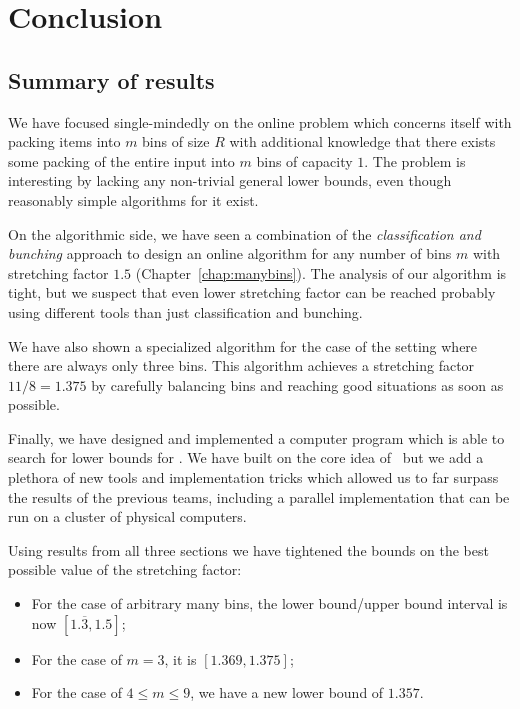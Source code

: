 \chapter{Conclusion}\label{chap:conclusion}

\section{Summary of results}

We have focused single-mindedly on the online problem \binstretch
which concerns itself with packing items into $m$ bins of size $R$
with additional knowledge that there exists some packing of the entire
input into $m$ bins of capacity $1$. The problem is interesting by
lacking any non-trivial general lower bounds, even though reasonably
simple algorithms for it exist.

On the algorithmic side, we have seen a combination of the
\emph{classification and bunching} approach to design an online
algorithm for any number of bins $m$ with stretching factor $1.5$
(Chapter~\ref{chap:manybins}).  The analysis of our algorithm is
tight, but we suspect that even lower stretching factor can be reached
probably using different tools than just classification and bunching.

We have also shown a specialized algorithm for the case of the setting
where there are always only three bins. This algorithm achieves a
stretching factor $11/8 = 1.375$ by carefully balancing bins and
reaching good situations as soon as possible.

Finally, we have designed and implemented a computer program which is
able to search for lower bounds for \binstretch. We have built on the
core idea of~\cite{gabay2013lbv2} but we add a plethora of new tools
and implementation tricks which allowed us to far surpass the results
of the previous teams, including a parallel implementation that can be
run on a cluster of physical computers.

Using results from all three sections we have tightened the bounds on
the best possible value of the stretching factor:

\begin{itemize}
\item For the case of arbitrary many bins, the lower bound/upper bound interval is now $[1.\overline{3}, 1.5]$; 
\item For the case of $m = 3$, it is $[1.369, 1.375]$;
\item For the case of $4 \le m \le 9$, we have a new lower bound of $1.357$.
\end{itemize}

